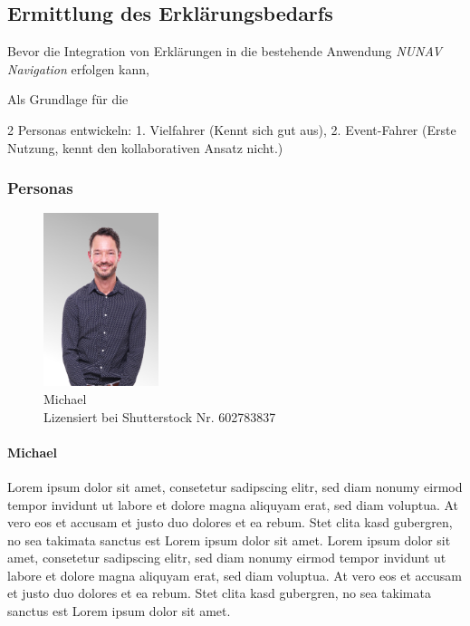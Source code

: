 \subsection{Ermittlung des Erklärungsbedarfs}

Bevor die Integration von Erklärungen in die bestehende Anwendung \textit{NUNAV Navigation} erfolgen kann, 

Als Grundlage für die 


2 Personas entwickeln: 1. Vielfahrer (Kennt sich gut aus), 2. Event-Fahrer (Erste Nutzung, kennt den kollaborativen Ansatz nicht.)

\newpage

\subsubsection{Personas}
\label{sec:06_model_evaluation:personas}

\begin{figure}
    \vspace{-\intextsep}
    \centering
    \includegraphics[width=0.3\textwidth]{contents/06_model_evaluation/01_integration/res/persona_picture_michael.png}
    \caption{Michael\\Lizensiert bei Shutterstock Nr. 602783837}
\end{figure}

\paragraph{Michael} Lorem ipsum dolor sit amet, consetetur sadipscing elitr, sed diam nonumy eirmod tempor invidunt ut labore et dolore magna aliquyam erat, sed diam voluptua. At vero eos et accusam et justo duo dolores et ea rebum. Stet clita kasd gubergren, no sea takimata sanctus est Lorem ipsum dolor sit amet. Lorem ipsum dolor sit amet, consetetur sadipscing elitr, sed diam nonumy eirmod tempor invidunt ut labore et dolore magna aliquyam erat, sed diam voluptua. At vero eos et accusam et justo duo dolores et ea rebum. Stet clita kasd gubergren, no sea takimata sanctus est Lorem ipsum dolor sit amet.

